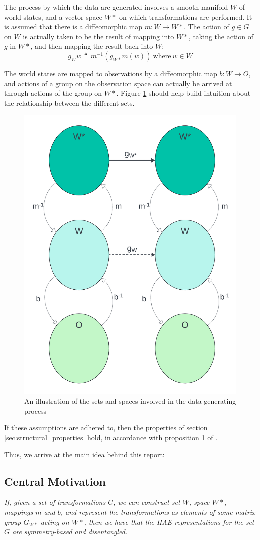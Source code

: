 \documentclass[10pt]{article} %
\begin{document}
 The process by which the data are generated involves a smooth manifold $W$ of world states, and a vector space $W*$ on which transformations are performed. It is assumed that there is a diffeomorphic map $m: W \rightarrow W*$. The action of $g \in G$ on $W$ is actually taken to be the result of mapping into $W*$, taking the action of $g$ in $W*$, and then mapping the result back into $W$:
 \[ 
 g_Ww \triangleq m^{-1}(g_{W*}m(w))
 ~\text{where}~w \in W\]

 The world states are mapped to observations by a diffeomorphic map $b: W \rightarrow O$, and actions of a group on the observation space can actually be arrived at through actions of the group on $W*$. Figure \ref{fig:diffhae} should help build intuition about the relationship between the different sets.

 \begin{figure}[h]
 \begin{center}
   \includegraphics[width=0.5\linewidth]{./DiffHAE.png}
 \end{center} 
 \caption{An illustration of the sets and spaces involved in the data-generating process}
 \label{fig:diffhae}
\end{figure} 

If these assumptions are adhered to, then the properties of section \ref{sec:structural_properties} hold, in accordance with proposition 1 of \cite{keurti2023homomorphism}.

Thus, we arrive at the main idea behind this report: 
\subsection{Central Motivation}
\label{sec:central_motivation}
\textit{If, given a set of transformations $G$, we can construct set $W$, space $W*$, mappings $m$ and $b$, and represent the transformations as elements of some matrix group $G_{W*}$ acting on $W*$, then we have that the HAE-representations for the set $G$ are symmetry-based and disentangled.}
\end{document}
